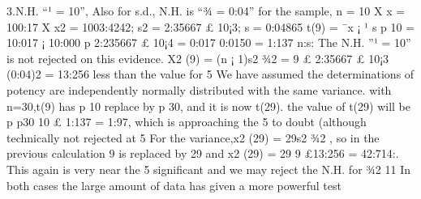3.N.H. “¹ = 10”, Also for s.d., N.H. is “¾ = 0:04”
for the sample,
n = 10
X
x = 100:17
X
x2 = 1003:4242; s2 = 2:35667 £ 10¡3; s = 0:04865
t(9) =
¯x ¡ ¹
s
p
10
=
10:017 ¡ 10:000
p
2:235667 £ 10¡4
=
0:017
0:0150
= 1:137 n:s:
The N.H. ”¹ = 10” is not rejected on this evidence.
X2
(9) =
(n ¡ 1)s2
¾2 =
9 £ 2:35667 £ 10¡3
(0:04)2 = 13:256
less than the value for 5%
We have assumed the determinations of potency are independently normally distributed
with the same variance.
with n=30,t(9) has
p
10 replace by
p
30, and it is now t(29). the value of t(29) will be
p
p30
10
£
1:137 = 1:97, which is approaching the 5%
to doubt (although technically not rejected at 5%
For the variance,x2
(29) = 29s2
¾2 , so in the previous calculation 9 is replaced by 29 and
x2
(29) = 29
9 £13:256 = 42:714:. This again is very near the 5%
significant and we may reject the N.H. for ¾2
11
In both cases the large amount of data has given a more powerful test
